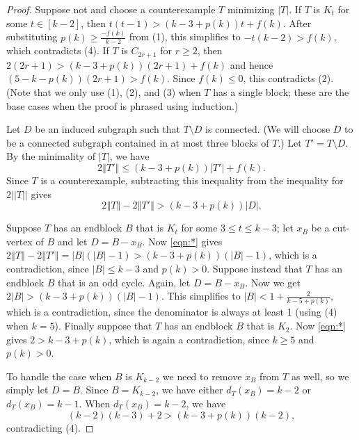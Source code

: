 \documentclass[12pt]{article}
\theoremstyle{plain}
\theoremstyle{definition}
\theoremstyle{remark}
\newcommand{\set}[1]{\left\{ #1 \right\}}
\newcommand{\card}[1]{\left|#1\right|}
\newcommand{\size}[1]{\left\Vert#1\right\Vert}
\newcommand{\irange}[1]{\left[#1\right]}
\newcommand{\parens}[1]{\left( #1 \right)}
\begin{document}
\begin{proof}
Suppose not and choose a counterexample $T$ minimizing $|T|$.  If $T$ is $K_t$
for some $t \in \irange{k-2}$, then $t(t-1) > (k-3 + p(k))t + f(k)$.
After substituting $p(k)\ge \frac{-f(k)}{k-2}$ from (1), this simplifies to
$-t(k-2)>f(k)$, 
which contradicts (4).  If $T$ is $C_{2r+1}$ for $r \ge 2$, then $2(2r+1) > (k-3 +
p(k))(2r+1) + f(k)$ and hence $(5-k-p(k))(2r+1)>f(k)$.
Since $f(k)\le 0$, this contradicts (2).  (Note that we only use (1), (2), and (3) when $T$ has a single block;
these are the base cases when the proof is phrased using induction.)

Let $D$ be an %
induced subgraph such that $T\setminus D$ is connected.  (We will choose $D$ to
be a connected subgraph contained in at most three blocks of $T$.)
Let $T' = T \setminus D$. %
By the minimality of $|T|$, we have
	\[2\size{T'} \le (k-3 + p(k))\card{T'} + f(k).\]
	Since $T$ is a counterexample, subtracting this inequality from the inequality for
$2||T||$ gives
	\begin{equation}
	2\size{T} - 2\size{T'} > (k-3 + p(k))|D|. \tag{*}\label{eqn:*}
	\end{equation}
	
Suppose $T$ has an endblock $B$ that 
is $K_t$ for some $3 \le
t \le k-3$; let $x_B$ be a cut-vertex of $B$ 
and let $D=B-x_B$.
Now \eqref{eqn:*} gives $2\size{T}-2\size{T'} =
\card{B}(\card{B}-1)>(k-3+p(k))(|B|-1)$, which 
is a contradiction, since $|B|\le k-3$ and $p(k)>0$.
Suppose instead that $T$ has an endblock $B$ that is an odd cycle.  Again, let
$D=B-x_B$.  Now we get $2|B|>(k-3+p(k))(|B|-1)$.  This simplifies to $|B|<1+\frac2{k-5+p(k)}$, which is a contradiction, 
since the denominator is always at least 1 (using (4) when $k=5$).
Finally suppose that $T$ has an endblock $B$ that is $K_2$. Now \eqref{eqn:*} gives
$2 > k-3 + p(k)$, which is again a contradiction, since $k \ge 5$ and $p(k) > 0$.
	
To handle the case when $B$ is $K_{k-2}$ we need to remove $x_B$ from $T$ as
well, so we simply let $D=B$.  
Since $B=K_{k-2}$, we have either $d_T(x_B) = k - 2$ or $d_T(x_B) =
k-1$. When $d_T(x_B) = k - 2$, we have
	\[(k-2)(k-3) +2 > (k-3 + p(k))(k-2),\]
	contradicting (4).
	

\end{proof}
\end{document}

